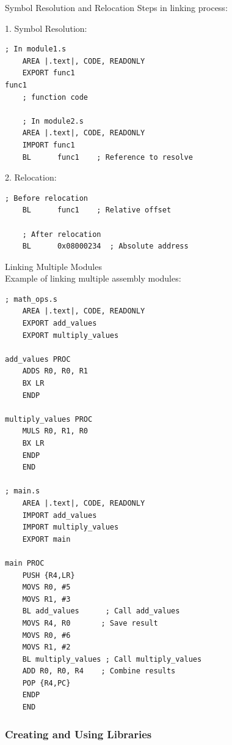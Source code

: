 \begin{KR}{Symbol Resolution and Relocation}
Steps in linking process:

1. Symbol Resolution:
\begin{lstlisting}[language=armasm, style=basesmol]
    ; In module1.s
    AREA |.text|, CODE, READONLY
    EXPORT func1
func1
    ; function code
    
    ; In module2.s
    AREA |.text|, CODE, READONLY
    IMPORT func1
    BL      func1    ; Reference to resolve
\end{lstlisting}

2. Relocation:
\begin{lstlisting}[language=armasm, style=basesmol]
    ; Before relocation
    BL      func1    ; Relative offset
    
    ; After relocation
    BL      0x08000234  ; Absolute address
\end{lstlisting}
\end{KR}

\begin{example2}{Linking Multiple Modules}\\
Example of linking multiple assembly modules:

\begin{lstlisting}[language=armasm, style=basesmol]
; math_ops.s
    AREA |.text|, CODE, READONLY
    EXPORT add_values
    EXPORT multiply_values
    
add_values PROC
    ADDS R0, R0, R1
    BX LR
    ENDP
    
multiply_values PROC
    MULS R0, R1, R0
    BX LR
    ENDP
    END
    
; main.s
    AREA |.text|, CODE, READONLY
    IMPORT add_values
    IMPORT multiply_values
    EXPORT main
    
main PROC
    PUSH {R4,LR}
    MOVS R0, #5
    MOVS R1, #3
    BL add_values      ; Call add_values
    MOVS R4, R0       ; Save result
    MOVS R0, #6
    MOVS R1, #2
    BL multiply_values ; Call multiply_values
    ADD R0, R0, R4    ; Combine results
    POP {R4,PC}
    ENDP
    END
\end{lstlisting}
\end{example2}

\subsubsection{Creating and Using Libraries}



